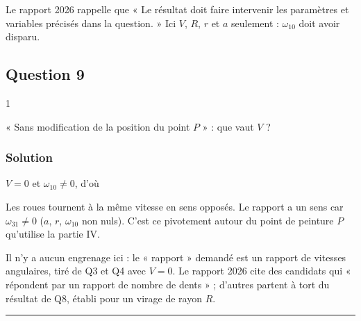 \documentclass[11pt,a4paper]{article}
\newcommand{\equationajustee}[1]{%
  \sbox{\boiteequation}{$\displaystyle #1$}%
  \ifdim\wd\boiteequation>\linewidth
    \[\resizebox{\linewidth}{!}{\usebox{\boiteequation}}\]%
  \else
    \[#1\]%
  \fi}
\begin{document}
\begin{jury}

Le rapport 2026 rappelle que « Le résultat doit faire intervenir les paramètres et variables précisés dans la question. » Ici \(V\), \(R\), \(r\) et \(a\) seulement : \(\omega_{10}\) doit avoir disparu.

\end{jury}

\hypertarget{question-9}{%
\subsection{Question 9}\label{question-9}}

\begin{indication}{1}

« Sans modification de la position du point \(P\) » : que vaut \(V\) ?

\end{indication}

\hypertarget{solution-8}{%
\subsubsection{Solution}\label{solution-8}}

\(V = 0\) et \(\omega_{10} \neq 0\), d'où

\equationajustee{\boxed{\omega_{21} = \frac{a\,\omega_{10}}{r}}}

\equationajustee{\boxed{\omega_{31} = -\frac{a\,\omega_{10}}{r}}}

\equationajustee{\boxed{\frac{\omega_{21}}{\omega_{31}} = -1}}

Les roues tournent à la même vitesse en sens opposés. Le rapport a un sens car \(\omega_{31} \neq 0\) (\(a\), \(r\), \(\omega_{10}\) non nuls). C'est ce pivotement autour du point de peinture \(P\) qu'utilise la partie IV.

\begin{piege}

Il n'y a aucun engrenage ici : le « rapport » demandé est un rapport de vitesses angulaires, tiré de Q3 et Q4 avec \(V = 0\). Le rapport 2026 cite des candidats qui « répondent par un rapport de nombre de dents » ; d'autres partent à tort du résultat de Q8, établi pour un virage de rayon \(R\).

\end{piege}

\begin{center}\rule{0.5\linewidth}{0.5pt}\end{center}
\end{document}
